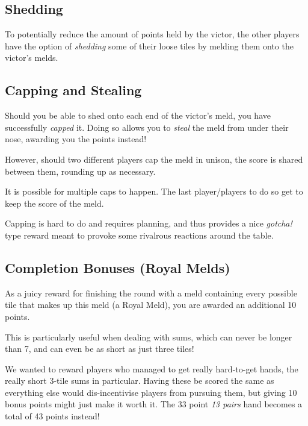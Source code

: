 \subsection{Shedding}
To potentially reduce the amount of points held by the victor, the other players have the option of \textit{shedding} some of their loose tiles by melding them onto the victor's melds.

\subsection{Capping and Stealing}
Should you be able to shed onto each end of the victor's meld, you have successfully \textit{capped} it. Doing so allows you to \textit{steal} the meld from under their nose, awarding you the points instead!

However, should two different players cap the meld in unison, the score is shared between them, rounding up as necessary.

\note It is possible for multiple caps to happen. The last player/players to do so get to keep the score of the meld.

\aside Capping is hard to do and requires planning, and thus provides a nice \textit{gotcha!} type reward meant to provoke some rivalrous reactions around the table.

\subsection{Completion Bonuses (Royal Melds)}
As a juicy reward for finishing the round with a meld containing every possible tile that makes up this meld (a Royal Meld), you are awarded an additional 10 points.

This is particularly useful when dealing with sums, which can never be longer than 7, and can even be as short as just three tiles!

\aside We wanted to reward players who managed to get really hard-to-get hands, the really short 3-tile sums in particular. Having these be scored the same as everything else would dis-incentivise players from pursuing them, but giving 10 bonus points might just make it worth it. The 33 point \textit{13 pairs} hand becomes a total of 43 points instead!